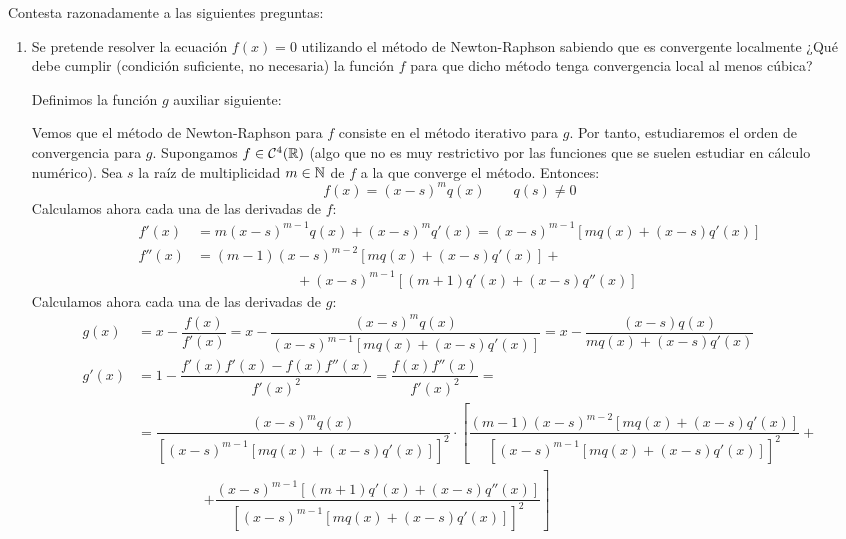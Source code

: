 \begin{ejercicio}
    Contesta razonadamente a las siguientes preguntas:
    \begin{enumerate}
        \item Se pretende resolver la ecuación $f(x) = 0$ utilizando el método de Newton-Raphson sabiendo que es convergente localmente ¿Qué debe cumplir (condición suficiente, no necesaria) la función $f$ para que dicho método tenga convergencia local al menos cúbica?
        

        Definimos la función $g$ auxiliar siguiente:

        Vemos que el método de Newton-Raphson para $f$ consiste en el método iterativo para $g$.
        Por tanto, estudiaremos el orden de convergencia para $g$.
        Supongamos $f\in \mathcal{C}^4(\mathbb{R})$ (algo que no es muy restrictivo por las funciones que se suelen estudiar en cálculo numérico).
        Sea $s$ la raíz de multiplicidad $m\in \mathbb{N}$ de $f$ a la que converge el método. Entonces:
        \begin{equation*}
            f(x)=(x-s)^mq(x)\qquad q(s)\neq 0
        \end{equation*}
        Calculamos ahora cada una de las derivadas de $f$:
        \begin{align*}
            f'(x)&=m(x-s)^{m-1}q(x)+(x-s)^mq'(x)
            = (x-s)^{m-1}[mq(x)+(x-s)q'(x)]\\
            f''(x)&=(m-1)(x-s)^{m-2}[mq(x)+(x-s)q'(x)]+\\&\hspace{3cm}+(x-s)^{m-1}[(m+1)q'(x)+(x-s)q''(x)]
        \end{align*}
        Calculamos ahora cada una de las derivadas de $g$:
        \begin{align*}
            g(x) &= x - \dfrac{f(x)}{f'(x)} = x - \dfrac{(x-s)^mq(x)}{(x-s)^{m-1}[mq(x)+(x-s)q'(x)]}
            = x - \dfrac{(x-s)q(x)}{mq(x)+(x-s)q'(x)}\\
            g'(x) &= 1 - \dfrac{f'(x)f'(x) - f(x)f''(x)}{f'(x)^2} = \dfrac{f(x)f''(x)}{f'(x)^2}
            =\\&= \dfrac{(x-s)^mq(x)}{[(x-s)^{m-1}[mq(x)+(x-s)q'(x)]]^2}
            \cdot\left[ \dfrac{(m-1)(x-s)^{m-2}[mq(x)+(x-s)q'(x)]}{[(x-s)^{m-1}[mq(x)+(x-s)q'(x)]]^2}\right.
            +\\&\hspace{2cm}\left.+ \dfrac{(x-s)^{m-1}[(m+1)q'(x)+(x-s)q''(x)]}{[(x-s)^{m-1}[mq(x)+(x-s)q'(x)]]^2}\right]

\end{align*}
\end{enumerate}
\end{ejercicio}

